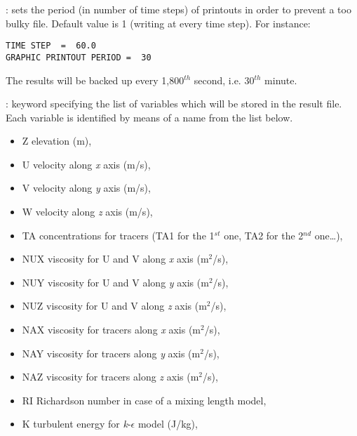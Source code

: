 : sets the period (in number of time steps) of
printouts in order to prevent a too bulky file.  Default value is 1 (writing at
every time step). For instance:

\begin{lstlisting}[language=TelemacCas]
TIME STEP  =  60.0
GRAPHIC PRINTOUT PERIOD =  30
\end{lstlisting}

The results will be backed up every 1,800${}^{th}$ second, i.e. 30${}^{th}$
minute.

: keyword specifying the list of
variables which will be stored in the result file. Each variable is identified
by means of a name from the list below.

\begin{itemize}
\item Z elevation (m),

\item U velocity along \textit{x} axis (m/s),

\item V velocity along \textit{y} axis (m/s),

\item W velocity along \textit{z} axis (m/s),

\item TA concentrations for tracers (TA1 for the 1${}^{st}$ one, TA2 for the
2${}^{nd}$ one\dots ),

\item NUX viscosity for U and V along \textit{x} axis (m${}^{2}$/s),

\item NUY viscosity for U and V along \textit{y} axis (m${}^{2}$/s),

\item NUZ viscosity for U and V along \textit{z} axis (m${}^{2}$/s),

\item NAX viscosity for tracers along \textit{x} axis (m${}^{2}$/s),

\item NAY viscosity for tracers along \textit{y} axis (m${}^{2}$/s),

\item NAZ viscosity for tracers along \textit{z} axis (m${}^{2}$/s),

\item RI Richardson number in case of a mixing length model,

\item K turbulent energy for \textit{k}-$\epsilon$ model (J/kg),


\end{itemize}
